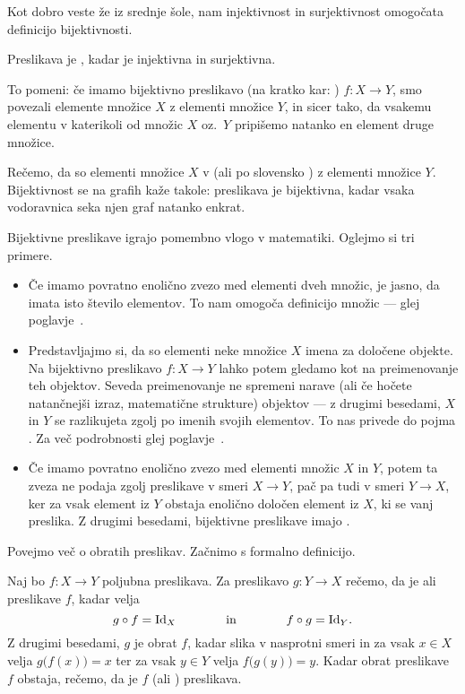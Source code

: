 Kot dobro veste že iz srednje šole, nam injektivnost in surjektivnost omogočata definicijo bijektivnosti.

\begin{definicija}
Preslikava je , kadar je injektivna in surjektivna.
\end{definicija}

To pomeni: če imamo bijektivno preslikavo (na kratko kar: ) $f\colon X \to Y$, smo povezali elemente množice $X$ z elementi množice $Y$, in sicer tako, da vsakemu elementu v katerikoli od množic $X$ oz.~$Y$ pripišemo natanko en element druge množice.


Rečemo, da so elementi množice $X$ v  (ali po slovensko ) z elementi množice $Y$. Bijektivnost se na grafih kaže takole: preslikava je bijektivna, kadar vsaka vodoravnica seka njen graf natanko enkrat.

Bijektivne preslikave igrajo pomembno vlogo v matematiki. Oglejmo si tri primere.
\begin{itemize}
\item
Če imamo povratno enolično zvezo med elementi dveh množic, je jasno, da imata isto število elementov. To nam omogoča definicijo  množic --- glej poglavje~.
\item
Predstavljajmo si, da so elementi neke množice $X$ imena za določene objekte. Na bijektivno preslikavo $f\colon X \to Y$ lahko potem gledamo kot na preimenovanje teh objektov. Seveda preimenovanje ne spremeni narave (ali če hočete natančnejši izraz, matematične strukture) objektov --- z drugimi besedami, $X$ in $Y$ se razlikujeta zgolj po imenih svojih elementov. To nas privede do pojma . Za več podrobnosti glej poglavje~.
\item
Če imamo povratno enolično zvezo med elementi množic $X$ in $Y$, potem ta zveza ne podaja zgolj preslikave v smeri $X \to Y$, pač pa tudi v smeri $Y \to X$, ker za vsak element iz $Y$ obstaja enolično določen element iz $X$, ki se vanj preslika. Z drugimi besedami, bijektivne preslikave imajo .
\end{itemize}

Povejmo več o obratih preslikav. Začnimo s formalno definicijo.

\begin{definicija}
Naj bo $f\colon X \to Y$ poljubna preslikava. Za preslikavo $g\colon Y \to X$ rečemo, da je  ali  preslikave $f$, kadar velja
\[g \circ f = \id[X] \qquad\qquad \text{in} \qquad\qquad f \circ g = \id[Y].\]
Z drugimi besedami, $g$ je obrat $f$, kadar slika v nasprotni smeri in za vsak $x \in X$ velja $g\big(f(x)\big) = x$ ter za vsak $y \in Y$ velja $f\big(g(y)\big) = y$. Kadar obrat preslikave $f$ obstaja, rečemo, da je $f$  (ali ) preslikava.
\end{definicija}

